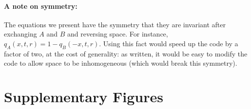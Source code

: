\documentclass[11pt,letterpaper]{article}
\begin{document}
\paragraph{A note on symmetry:}
The equations we present have the symmetry that they are invariant after exchanging $A$ and $B$ and reversing space.
For instance, $q_A(x,t,r) = 1 - q_B(-x,t,r)$.
Using this fact would speed up the code by a factor of two,
at the cost of generality:
as written, it would be easy to modify the code to allow space to be inhomogeneous 
(which would break this symmetry).


\section{Supplementary Figures}

\end{document}
